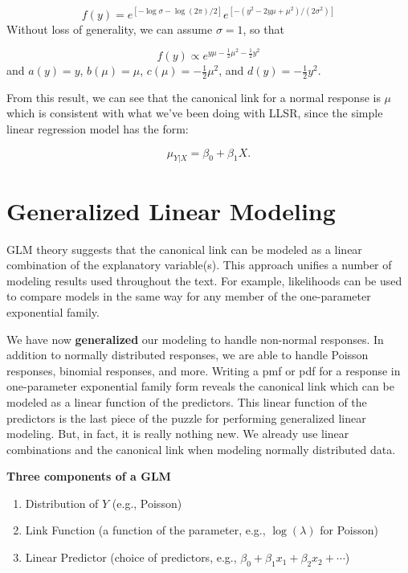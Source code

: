 \documentclass[
]{krantz}
\providecommand{\tightlist}{%
  \setlength{\itemsep}{0pt}\setlength{\parskip}{0pt}}
\begin{document}
\[
f(y)=e^{[-\log{\sigma}-\log(2\pi)/2]}{e^{[-{(y^2-2y\mu +\mu^2)}/{(2\sigma^2)}]}}
\]
Without loss of generality, we can assume \(\sigma=1\), so that

\[
f(y) \propto e^{y\mu - \frac{1}{2} \mu^2 - \frac{1}{2} y^2}
\]
and \(a(y)=y\), \(b(\mu)=\mu\), \(c(\mu)= -\frac{1}{2}\mu^2\), and \(d(y) = - \frac{1}{2} y^2\).

From this result, we can see that the canonical link for a normal response is \(\mu\) which is consistent with what we've been doing with LLSR, since the simple linear regression model has the form:

\[ \mu_{Y|X} = \beta_0 + \beta_1X. \]

\section{Generalized Linear Modeling}\label{generalized-linear-modeling}

GLM theory suggests that the canonical link can be modeled as a linear combination of the explanatory variable(s). This approach unifies a number of modeling results used throughout the text. For example, likelihoods can be used to compare models in the same way for any member of the one-parameter exponential family.

We have now \textbf{generalized} our modeling to handle non-normal responses. In addition to normally distributed responses, we are able to handle Poisson responses, binomial responses, and more. Writing a pmf or pdf for a response in one-parameter exponential family form reveals the canonical link which can be modeled as a linear function of the predictors. This linear function of the predictors is the last piece of the puzzle for performing generalized linear modeling. But, in fact, it is really nothing new. We already use linear combinations and the canonical link when modeling normally distributed data.

\textbf{Three components of a GLM}

\begin{enumerate}
\def\labelenumi{\arabic{enumi}.}
\tightlist
\item
  Distribution of \(Y\) (e.g., Poisson)
\item
  Link Function (a function of the parameter, e.g., \(\log(\lambda)\) for Poisson)
\item
  Linear Predictor (choice of predictors,
  e.g., \(\beta_0 + \beta_1 x_1 + \beta_2 x_2 + \cdots\))
\end{enumerate}
\end{document}
